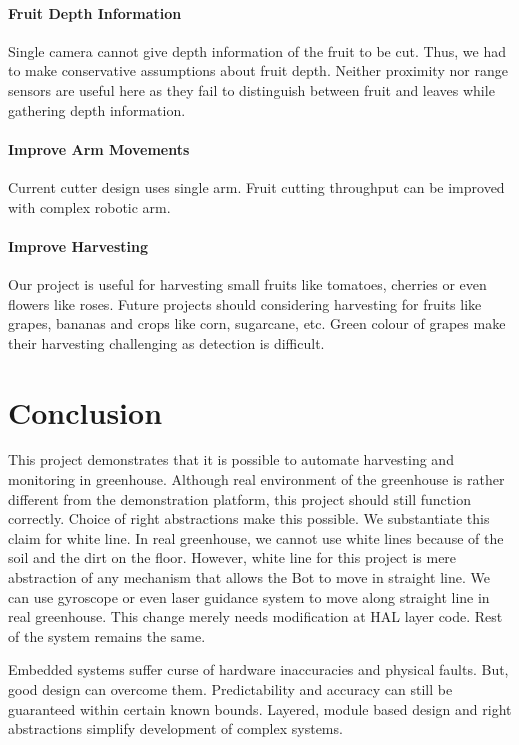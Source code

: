 \documentclass[a4paper, 12pt]{article}
\begin{document}
\paragraph{Fruit Depth Information} Single camera cannot give depth information of the fruit to be cut. Thus,
we had to make conservative assumptions about fruit depth. Neither proximity nor range sensors are useful here as 
they fail to distinguish between fruit and leaves while gathering depth information.

\paragraph{Improve Arm Movements} Current cutter design uses single arm. Fruit cutting throughput can be improved 
with complex robotic arm.

\paragraph{Improve Harvesting} Our project is useful for harvesting small fruits like tomatoes, cherries or even
flowers like roses. Future projects should considering harvesting for fruits like grapes, bananas and crops like
corn, sugarcane, etc. Green colour of grapes make their harvesting challenging as detection is difficult.


\section{Conclusion}
This project demonstrates that it is possible to automate harvesting and monitoring in greenhouse. Although real
environment of the greenhouse is rather different from the demonstration platform, this project should still 
function correctly. Choice of right abstractions make this possible. We substantiate this claim for white line. In real
greenhouse, we cannot use white lines because of the soil and the dirt on the floor. However, white line for this project is
mere abstraction of any mechanism that allows the Bot to move in straight line. We can use gyroscope or even
laser guidance system to move along straight line in real greenhouse. This change merely needs modification at HAL
layer code. Rest of the system remains the same.

Embedded systems suffer curse of hardware inaccuracies and physical faults. But, good design can overcome them.
Predictability and accuracy can still be guaranteed within certain known bounds. Layered, module based design and right
abstractions simplify development of complex systems. 



\end{document}
